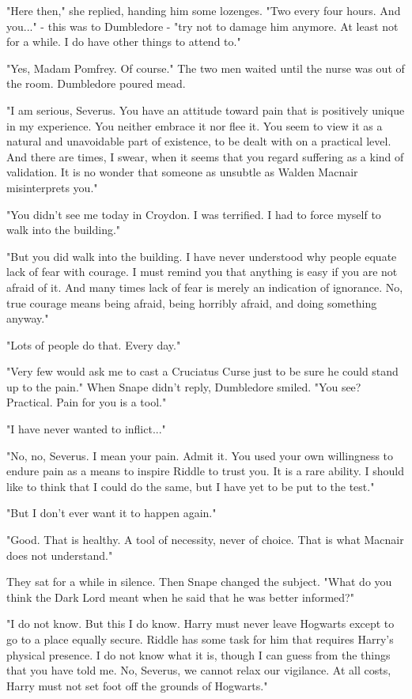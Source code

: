 "Here then," she replied, handing him some lozenges. "Two every four hours. And you..." - this was to Dumbledore - "try not to damage him anymore. At least not for a while. I do have other things to attend to."

"Yes, Madam Pomfrey. Of course." The two men waited until the nurse was out of the room. Dumbledore poured mead.

"I am serious, Severus. You have an attitude toward pain that is positively unique in my experience. You neither embrace it nor flee it. You seem to view it as a natural and unavoidable part of existence, to be dealt with on a practical level. And there are times, I swear, when it seems that you regard suffering as a kind of validation. It is no wonder that someone as unsubtle as Walden Macnair misinterprets you."

"You didn't see me today in Croydon. I was terrified. I had to force myself to walk into the building."

"But you did walk into the building. I have never understood why people equate lack of fear with courage. I must remind you that anything is easy if you are not afraid of it. And many times lack of fear is merely an indication of ignorance. No, true courage means being afraid, being horribly afraid, and doing something anyway."

"Lots of people do that. Every day."

"Very few would ask me to cast a Cruciatus Curse just to be sure he could stand up to the pain." When Snape didn't reply, Dumbledore smiled. "You see? Practical. Pain for you is a tool."

"I have never wanted to inflict..."

"No, no, Severus. I mean your pain. Admit it. You used your own willingness to endure pain as a means to inspire Riddle to trust you. It is a rare ability. I should like to think that I could do the same, but I have yet to be put to the test."

"But I don't ever want it to happen again."

"Good. That is healthy. A tool of necessity, never of choice. That is what Macnair does not understand."

They sat for a while in silence. Then Snape changed the subject. "What do you think the Dark Lord meant when he said that he was better informed?"

"I do not know. But this I do know. Harry must never leave Hogwarts except to go to a place equally secure. Riddle has some task for him that requires Harry's physical presence. I do not know what it is, though I can guess from the things that you have told me. No, Severus, we cannot relax our vigilance. At all costs, Harry must not set foot off the grounds of Hogwarts."

